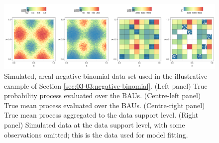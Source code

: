 \documentclass[nojss]{jss}
\newcommand{\fct}[1]{\code{#1()}}
\begin{document}
\begin{figure}[t!]
    \centering
    \includegraphics[width = \linewidth]{img/Negbinom_sim_data.png}
    \caption{Simulated, areal negative-binomial data set used in the illustrative example of Section \ref{sec:03-03:negative-binomial}. 
    (Left panel) True probability process evaluated over the BAUs. 
    (Centre-left panel) True mean process evaluated over the BAUs. 
    (Centre-right panel) True mean process aggregated to the data support level. 
    (Right panel) Simulated data at the data support level, with some observations omitted; this is the data used for model fitting.  
}   
  \label{fig:03-02-negative-binomial_data}
\end{figure}



\end{document}
